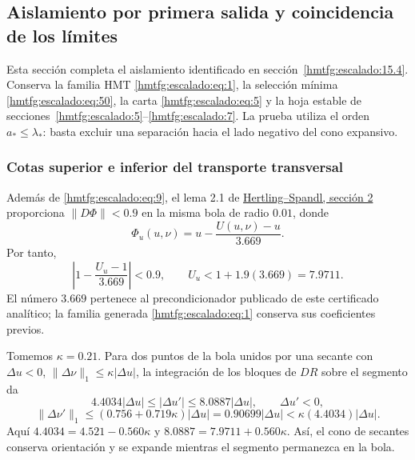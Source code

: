 \subsection{Aislamiento por primera salida y coincidencia de los límites}
\label{hmtfg:escalado:16}

Esta sección completa el aislamiento identificado en sección~\ref{hmtfg:escalado:15.4}. Conserva la familia HMT \eqref{hmtfg:escalado:eq:1}, la selección mínima \eqref{hmtfg:escalado:eq:50}, la carta \eqref{hmtfg:escalado:eq:5} y la hoja estable de secciones~\ref{hmtfg:escalado:5}--\ref{hmtfg:escalado:7}. La prueba utiliza el orden \(a_*\le\lambda_*\): basta excluir una separación hacia el lado negativo del cono expansivo.

\subsubsection{Cotas superior e inferior del transporte transversal}
\label{hmtfg:escalado:16.1}

Además de \eqref{hmtfg:escalado:eq:9}, el lema 2.1 de \href{https://arxiv.org/pdf/1410.3277}{Hertling–Spandl, sección 2} proporciona \(\|D\Phi\|<0.9\) en la misma bola de radio \(0.01\), donde
\[
\Phi_u(u,\nu)=u-\frac{U(u,\nu)-u}{3.669}.
\]
Por tanto,
\begin{equation}
\left|1-\frac{U_u-1}{3.669}\right|<0.9,\qquad
U_u<1+1.9(3.669)=7.9711.
\label{hmtfg:escalado:eq:53}
\end{equation}
El número \(3.669\) pertenece al precondicionador publicado de este certificado analítico; la familia generada \eqref{hmtfg:escalado:eq:1} conserva sus coeficientes previos.

Tomemos \(\kappa=0.21\). Para dos puntos de la bola unidos por una secante con
\(\Delta u<0\), \(\|\Delta\nu\|_1\le\kappa|\Delta u|\), la integración de los bloques de \(DR\) sobre el segmento da
\begin{equation}
4.4034|\Delta u|
\le|\Delta u'|\le8.0887|\Delta u|,\qquad \Delta u'<0,
\label{hmtfg:escalado:eq:54}
\end{equation}
\begin{equation}
\|\Delta\nu'\|_1
\le(0.756+0.719\kappa)|\Delta u|
=0.90699|\Delta u|
<\kappa(4.4034)|\Delta u|.
\label{hmtfg:escalado:eq:55}
\end{equation}
Aquí \(4.4034=4.521-0.560\kappa\) y \(8.0887=7.9711+0.560\kappa\). Así, el cono de secantes conserva orientación y se expande mientras el segmento permanezca en la bola.


